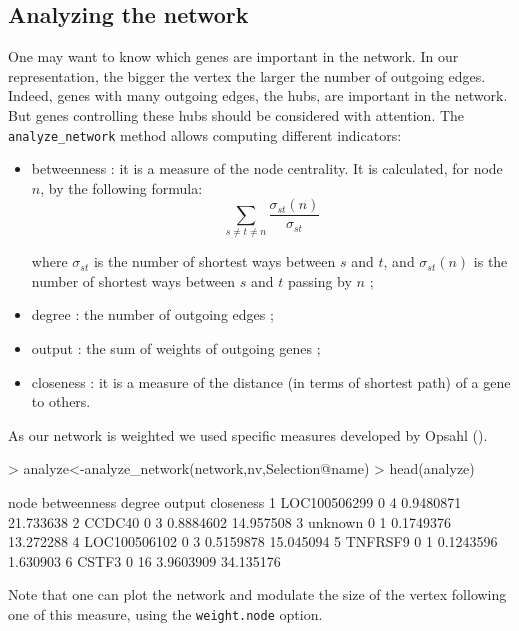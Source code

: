 \documentclass[a4paper]{article}
\begin{document}
\subsection{Analyzing the network}

One may want to know which genes are important in the network. In our representation, the bigger the vertex the larger the number of outgoing edges. Indeed, genes with many outgoing edges, the hubs, are important in the network. 
But genes controlling these hubs should be considered with attention. The \texttt{analyze\_network} method allows computing different indicators:

\begin{itemize}
\item betweenness : it is a measure of the node centrality. It is calculated, for node $n$, by the following formula: 
$$
\sum_{s\neq t \neq n}\frac{\sigma_{st}(n)}{\sigma_{st}}
$$

where $\sigma_{st}$ is the number of shortest ways between $s$ and $t$, and $\sigma_{st}(n)$ is the number of shortest ways between $s$ and $t$ passing by $n$ ;
\item degree : the number of outgoing edges ;
\item output : the sum of weights of outgoing genes ;
\item closeness : it is a measure of the distance (in terms of shortest path) of a gene to others.
\end{itemize}

As our network is weighted we used specific measures developed by Opsahl (\cite{bla}).
 
\begin{Schunk}
\begin{Sinput}
> analyze<-analyze_network(network,nv,Selection@name)
> head(analyze)
\end{Sinput}
\begin{Soutput}
          node betweenness degree    output closeness
1 LOC100506299           0      4 0.9480871 21.733638
2       CCDC40           0      3 0.8884602 14.957508
3      unknown           0      1 0.1749376 13.272288
4 LOC100506102           0      3 0.5159878 15.045094
5      TNFRSF9           0      1 0.1243596  1.630903
6        CSTF3           0     16 3.9603909 34.135176
\end{Soutput}
\end{Schunk}

Note that one can plot the network and modulate the size of the vertex following one of this measure, using the \texttt{weight.node} option. \\
\end{document}
